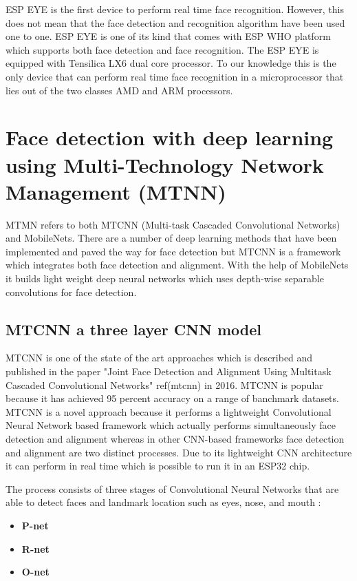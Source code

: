 ESP EYE is the first device to perform real time face recognition. However, this does not mean that the face detection and recognition algorithm have been used one to one. ESP EYE is one of its kind that comes with ESP WHO platform which supports both face detection and face recognition. The ESP EYE is equipped with Tensilica LX6 dual core processor. To our knowledge this is the only device that can perform real time face recognition in a microprocessor that lies out of the two classes AMD and ARM processors. 

\section{Face detection with deep learning using Multi-Technology Network Management (MTNN)}

MTMN refers to both MTCNN (Multi-task Cascaded Convolutional Networks) and MobileNets. There are a number of deep learning methods that have been implemented and paved the way for face detection but MTCNN is a framework which integrates both face detection and alignment. With the help of MobileNets it builds light weight deep neural networks which uses depth-wise separable convolutions for face detection.


\subsection{MTCNN a three layer CNN model}

MTCNN is one of the state of the art approaches which is described and published in the paper "Joint Face Detection and Alignment Using Multitask Cascaded Convolutional Networks" ref(mtcnn) in 2016. MTCNN is popular because it has achieved 95 percent accuracy on a range of banchmark datasets. MTCNN is a novel approach because it performs a lightweight Convolutional Neural Network based framework which actually performs simultaneously face detection and alignment whereas in other CNN-based frameworks face detection and alignment are two distinct processes.   
Due to its lightweight CNN architecture it can perform in real time which is possible to run it in an ESP32 chip. 

The process consists of three stages of Convolutional Neural Networks that are able to detect faces and landmark location such as eyes, nose, and mouth : 

\begin{itemize}
    \item \textbf{P-net} 
    \item \textbf{R-net} 
    \item \textbf{O-net} 
\end{itemize}


